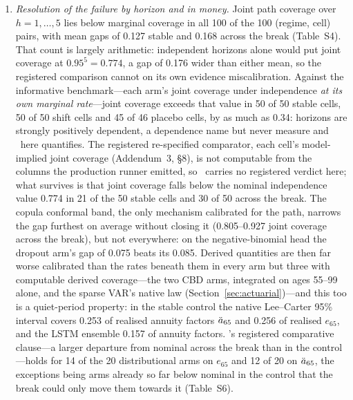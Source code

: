 \begin{enumerate}
  eight conformal wrappers recalibrated on pre-2020 residuals (EnbPI on
  Lee--Carter, 0.890 to 0.915), the rest LSTM arms already too low to
  fall further. \Hfour\ fails in its universal form and settles a
  disagreement with the prior: where \citet{dowd2010backtesting} found
  age~84 better behaved than age~65, the native Lee--Carter interval covers
  0.888, 0.760 and 0.501 across ages 0--24, 25--64 and 65--99 in the stable
  control, before any break (Table~S5). Old-age concentration is real for
  the Lee--Carter line and the LSTM arms but not universal: the CBD arms
  cover worse below age 65 than above it (native, shift: 0.626 against
  0.849). CBD is fitted on ages 55--99, so that 0.626 is a 55--64 stub
  rather than the registered 25--64 band and is not comparable with the
  full-age families.
\item \emph{Resolution of the failure by horizon and in money.} Joint path
  coverage over $h = 1,\dots,5$ lies below marginal coverage in all 100 of
  the 100 (regime, cell) pairs, with mean gaps of 0.127 stable and 0.168
  across the break (Table~S4). That count is largely arithmetic: independent
  horizons alone would put joint coverage at $0.95^{5} = 0.774$, a gap of
  0.176 wider than either mean, so the registered comparison
  cannot on its own evidence miscalibration. Against the
  informative benchmark---each arm's joint coverage under independence
  \emph{at its own marginal rate}---joint coverage exceeds that value in 50
  of 50 stable cells, 50 of 50 shift cells and 45 of 46 placebo cells, by as
  much as 0.34: horizons are strongly positively dependent, a dependence
  \citet{dowd2010backtesting} name but never measure and \Hthree\ here
  quantifies. The registered re-specified comparator, each cell's
  model-implied joint coverage (Addendum~3, \S8), is not computable from the
  columns the production runner emitted, so \Hthree\ carries no registered
  verdict here; what survives is that joint coverage falls below the nominal
  independence value 0.774 in 21 of the 50 stable cells and 30 of 50 across
  the break. The copula conformal band, the only mechanism calibrated for
  the path, narrows the gap furthest on average without
  closing it (0.805--0.927 joint coverage across the break), but not
  everywhere: on the negative-binomial head the dropout arm's gap of 0.075
  beats its 0.085. Derived quantities are then far worse calibrated than the
  rates beneath them in every arm but three with
  computable derived coverage---the two CBD arms, integrated on ages 55--99
  alone, and the sparse
  VAR's native law (Section~\ref{sec:actuarial})---and this too is a
  quiet-period property: in the stable control the native Lee--Carter 95\%
  interval covers 0.253 of realised annuity factors $\ddot{a}_{65}$ and 0.256 of
  realised $e_{65}$, and the LSTM ensemble 0.157 of annuity factors.
  \Hfive's registered comparative clause---a larger departure from nominal
  across the break than in the control---holds for 14 of the 20
  distributional arms on $e_{65}$ and 12 of 20 on $\ddot{a}_{65}$, the exceptions
  being arms already so far below nominal in the control that the break
  could only move them towards it (Table~S6).
\end{enumerate}
